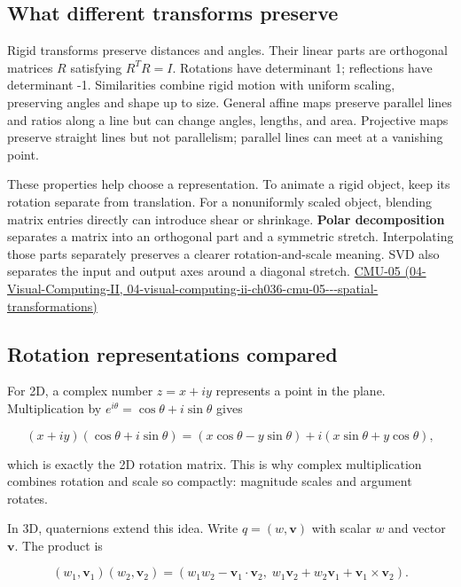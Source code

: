 \subsection{What different transforms preserve}\label{03-visual-computing-i-ch001-what-different-transforms-preserve}

Rigid transforms preserve distances and angles. Their linear parts are orthogonal matrices \(R\) satisfying \(R^TR=I\). Rotations have determinant 1; reflections have determinant -1. Similarities combine rigid motion with uniform scaling, preserving angles and shape up to size. General affine maps preserve parallel lines and ratios along a line but can change angles, lengths, and area. Projective maps preserve straight lines but not parallelism; parallel lines can meet at a vanishing point.

These properties help choose a representation. To animate a rigid object, keep its rotation separate from translation. For a nonuniformly scaled object, blending matrix entries directly can introduce shear or shrinkage. \textbf{Polar decomposition} separates a matrix into an orthogonal part and a symmetric stretch. Interpolating those parts separately preserves a clearer rotation-and-scale meaning. SVD also separates the input and output axes around a diagonal stretch. \href{../04-Visual-Computing-II/main.pdf\#nameddest=04-visual-computing-ii-ch036-cmu-05---spatial-transformations}{CMU-05 (04-Visual-Computing-II, 04-visual-computing-ii-ch036-cmu-05-\/-\/-spatial-transformations)}

\subsection{Rotation representations compared}\label{03-visual-computing-i-ch001-rotation-representations-compared}

For 2D, a complex number \(z=x+iy\) represents a point in the plane. Multiplication by \(e^{i\theta}=\cos\theta+i\sin\theta\) gives

\[
(x+iy)(\cos\theta+i\sin\theta)=(x\cos\theta-y\sin\theta)+i(x\sin\theta+y\cos\theta),
\]

which is exactly the 2D rotation matrix. This is why complex multiplication combines rotation and scale so compactly: magnitude scales and argument rotates.

In 3D, quaternions extend this idea. Write \(q=(w,\mathbf v)\) with scalar \(w\) and vector \(\mathbf v\). The product is

\[
(w_1,\mathbf v_1)(w_2,\mathbf v_2)=
(w_1w_2-\mathbf v_1\cdot\mathbf v_2,\;w_1\mathbf v_2+w_2\mathbf v_1+\mathbf v_1\times\mathbf v_2).
\]

